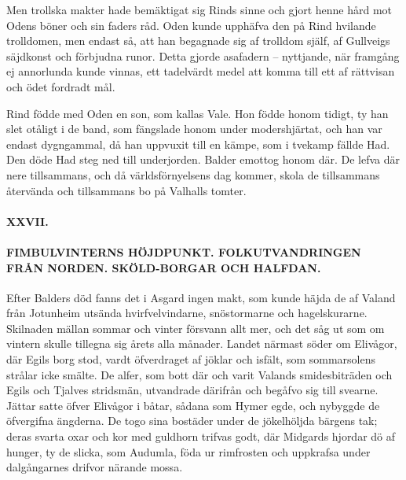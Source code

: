 Men trollska makter hade bemäktigat sig Rinds sinne och gjort henne hård
mot Odens böner och sin faders råd. Oden kunde upphäfva den på Rind
hvilande trolldomen, men endast så, att han begagnade sig af trolldom
själf, af Gullveigs säjdkonst och förbjudna runor. Detta gjorde
asafadern -- nyttjande, när framgång ej annorlunda kunde vinnas, ett
tadelvärdt medel att komma till ett af rättvisan och ödet fordradt mål.

\protect\hypertarget{lb1625905.xhtmlux5cux23start91}{}{}\protect\hypertarget{lb1625905.xhtmlux5cux23start91-a}{}{}\protect\hypertarget{lb1625905.xhtmlux5cux23start91-b}{}{}\protect\hypertarget{lb1625905.xhtmlux5cux23start91-c}{}{}\protect\hypertarget{lb1625905.xhtmlux5cux23start91-d}{}{}

Rind födde med Oden en son, som kallas Vale. Hon födde honom tidigt, ty
han slet otåligt i de band, som fängslade honom under modershjärtat, och
han var endast dygngammal, då han uppvuxit till en kämpe, som i tvekamp
fällde Had. Den döde Had steg ned till underjorden. Balder emottog honom
där. De lefva där nere tillsammans, och då världsförnyelsens dag kommer,
skola de tillsammans återvända och tillsammans bo på Valhalls tomter.

\paragraph{XXVII.}

\paragraph{FIMBULVINTERNS HÖJDPUNKT. FOLKUTVANDRINGEN FRÅN NORDEN.
SKÖLD-BORGAR OCH HALFDAN.}

Efter Balders död fanns det i Asgard ingen makt, som kunde häjda de af
Valand från Jotunheim utsända hvirfvelvindarne, snöstormarne och
hagelskurarne. Skilnaden mällan sommar och vinter försvann allt mer, och
det såg ut som om vintern skulle tillegna sig årets alla månader. Landet
närmast söder om Elivågor, där Egils borg stod, vardt öfverdraget af
jöklar och isfält, som sommarsolens strålar icke smälte. De alfer, som
bott där och varit Valands smidesbiträden och Egils och Tjalves
stridsmän, utvandrade därifrån och begåfvo sig till svearne. Jättar
satte öfver Elivågor i båtar, sådana som Hymer egde, och nybyggde de
öfvergifna ängderna. De togo sina bostäder under de jökelhöljda bärgens
tak; deras svarta oxar och kor med guldhorn trifvas godt, där Midgards
hjordar dö af hunger, ty de slicka, som Audumla, föda ur rimfrosten och
uppkrafsa under dalgångarnes drifvor närande mossa.

